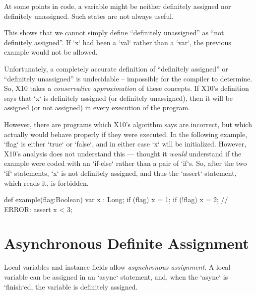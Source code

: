 At some points in code, a variable might be neither definitely assigned nor
definitely unassigned.    Such states are not always useful.  
% 
\begin{xten}
def example(flag : Boolean) {
  var x : Long;
  if (flag) x = 1;
  // x is neither def. assigned nor unassigned.
  x = 2; 
  // x is def. assigned.
\end{xten}
This shows that we cannot simply define ``definitely unassigned'' as ``not
definitely assigned''.   If \xcd`x` had been a \xcd`val` rather than a
\xcd`var`, the previous example would not be allowed.    

Unfortunately, a completely accurate definition of ``definitely assigned''
or ``definitely unassigned'' is undecidable -- impossible for the compiler to
determine.  So, X10 takes a {\em conservative approximation} of these
concepts.  If X10's definition says that \xcd`x` is definitely assigned (or
definitely unassigned), then it will be assigned (or not assigned) in every
execution of the program.  

However, there are programs which X10's algorithm says are incorrect, but
which actually would behave properly if they were executed.   In the following
example, \xcd`flag` is either \xcd`true` or \xcd`false`, and in either case
\xcd`x` will be initialized.  However, X10's analysis does not understand this
--- thought it {\em would} understand if the example were coded with an
\xcd`if-else` rather than a pair of \xcd`if`s.  So, after the two \xcd`if`
statements, \xcd`x` is not definitely assigned, and thus the \xcd`assert`
statement, which reads it, is forbidden.  
\begin{xten}
def example(flag:Boolean) {
  var x : Long;
  if (flag) x = 1;
  if (!flag) x = 2;
  // ERROR: assert x < 3;
}
\end{xten}

\section{Asynchronous Definite Assignment}


Local variables and instance fields allow {\em asynchronous assignment}. A local
variable can be assigned in an \xcd`async` statement, and, when the
\xcd`async` is \xcd`finish`ed, the variable is definitely assigned.  

